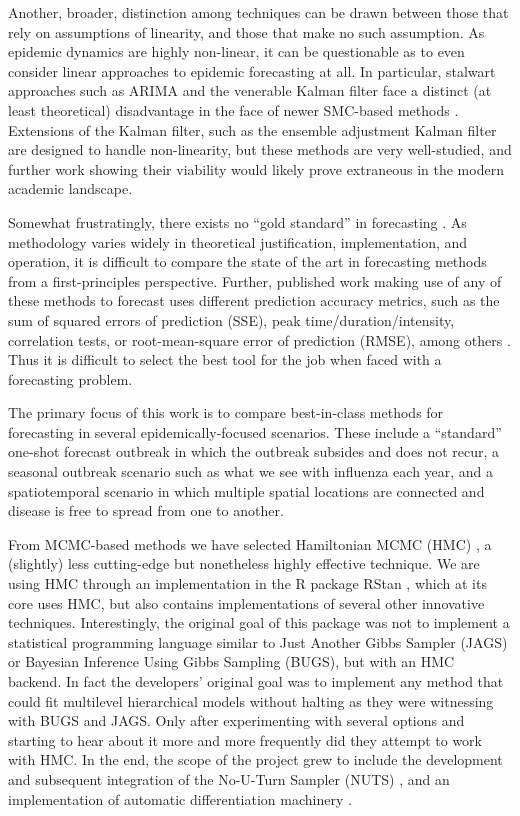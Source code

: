 Another, broader, distinction among techniques can be drawn between those that rely on assumptions of linearity, and those that make no such assumption. As epidemic dynamics are highly non-linear, it can be questionable as to even consider linear approaches to epidemic forecasting at all. In particular, stalwart approaches such as ARIMA and the venerable Kalman filter face a distinct (at least theoretical) disadvantage in the face of newer SMC-based methods \cite{Sugihara1994}\cite{Yang2014}. Extensions of the Kalman filter, such as the ensemble adjustment Kalman filter are designed to handle non-linearity, but these methods are very well-studied, and further work showing their viability would likely prove extraneous in the modern academic landscape.

Somewhat frustratingly, there exists no ``gold standard'' in forecasting \cite{Chretien2014}\cite{Nsoesie2014}\cite{Yang2014}. As methodology varies widely in theoretical justification, implementation, and operation, it is difficult to compare the state of the art in forecasting methods from a first-principles perspective. Further, published work making use of any of these methods to forecast uses different prediction accuracy metrics, such as the sum of squared errors of prediction (SSE), peak time/duration/intensity, correlation tests, or root-mean-square error of prediction (RMSE), among others \cite{Chretien2014}\cite{Nsoesie2013}. Thus it is difficult to select the best tool for the job when faced with a forecasting problem.

The primary focus of this work is to compare best-in-class methods for forecasting in several epidemically-focused scenarios. These include a ``standard'' one-shot forecast outbreak in which the outbreak subsides and does not recur, a seasonal outbreak scenario such as what we see with influenza each year, and a spatiotemporal scenario in which multiple spatial locations are connected and disease is free to spread from one to another.

From MCMC-based methods we have selected Hamiltonian MCMC (HMC) \cite{Neal2011}, a (slightly) less cutting-edge but nonetheless highly effective technique. We are using HMC through an implementation in the R package RStan \cite{Carpenter2016}, which at its core uses HMC, but also contains implementations of several other innovative techniques. Interestingly, the original goal of this package was not to implement a statistical programming language similar to Just Another Gibbs Sampler (JAGS) or Bayesian Inference Using Gibbs Sampling (BUGS), but with an HMC backend. In fact the developers' original goal was to implement any method that could fit multilevel hierarchical models without halting as they were witnessing with BUGS and JAGS. Only after experimenting with several options and starting to hear about it more and more frequently did they attempt to work with HMC. In the end, the scope of the project grew to include the development and subsequent integration of the No-U-Turn Sampler (NUTS) \cite{Hoffman2014}, and an implementation of automatic differentiation machinery \cite{StanDevelopmentTeam2015}.

